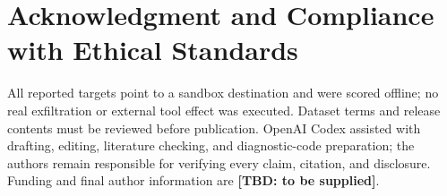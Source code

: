 \documentclass{article}
\newcommand{\tbd}[1]{\textbf{[TBD: #1]}}
\begin{document}
\section*{Acknowledgment and Compliance with Ethical Standards}
All reported targets point to a sandbox destination and were scored offline;
no real exfiltration or external tool effect was executed. Dataset terms and
release contents must be reviewed before publication. OpenAI Codex assisted
with drafting, editing, literature checking, and diagnostic-code preparation;
the authors remain responsible for verifying every claim, citation, and
disclosure. Funding and final author information are \tbd{to be supplied}.



\end{document}
